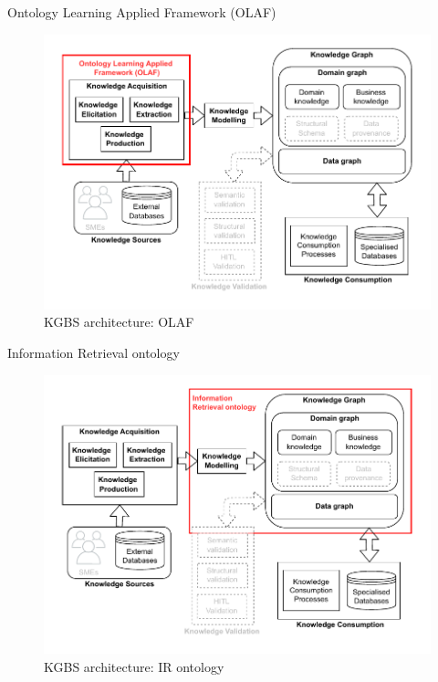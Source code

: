 \begin{frame}{Ontology Learning Applied Framework (OLAF)}

    \begin{figure} [H]
        \begin{center}
            \includegraphics[scale=0.5]{images/KGBS-knowledge-acquisition-OLAF.pdf} 
            \caption{KGBS architecture: OLAF} 
        \end{center}
    \end{figure}

\end{frame}

\begin{frame}{Information Retrieval ontology}

    \begin{figure} [H]
        \begin{center}
            \includegraphics[scale=0.5]{images/KGBS-knowledge-modelling-kg-IR-onto.pdf} 
            \caption{KGBS architecture: IR ontology} 
        \end{center}
    \end{figure}

\end{frame}

